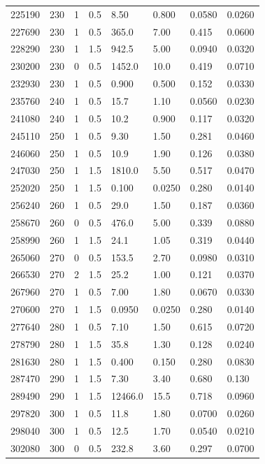 \documentclass[preview]{standalone}
\begin{document}
{{{\begin{tabular}{L{1.2cm}C{1.2cm} C{0.3cm}C{0.5cm} C{1.4cm}C{1.4cm} C{1.4cm}C{1.4cm}}
  225190  &   230  & 1     & 0.5 &  8.50  & 0.800  & 0.0580 &  0.0260   \\ 
  227690  &   230  & 1     & 0.5 &  365.0  & 7.00  & 0.415 &  0.0600   \\ 
  228290  &   230  & 1     & 1.5 &  942.5  & 5.00  & 0.0940 &  0.0320   \\ 
  230200  &   230  & 0     & 0.5 &  1452.0  & 10.0  & 0.419 &  0.0710   \\ 
  232930  &   230  & 1     & 0.5 &  0.900  & 0.500  & 0.152 &  0.0330   \\ 
  235760  &   240  & 1     & 0.5 &  15.7  & 1.10  & 0.0560 &  0.0230   \\ 
  241080  &   240  & 1     & 0.5 &  10.2  & 0.900  & 0.117 &  0.0320   \\ 
  245110  &   250  & 1     & 0.5 &  9.30  & 1.50  & 0.281 &  0.0460   \\ 
  246060  &   250  & 1     & 0.5 &  10.9  & 1.90  & 0.126 &  0.0380   \\ 
  247030  &   250  & 1     & 1.5 &  1810.0  & 5.50  & 0.517 &  0.0470   \\ 
  252020  &   250  & 1     & 1.5 &  0.100  & 0.0250  & 0.280 &  0.0140   \\ 
  256240  &   260  & 1     & 0.5 &  29.0  & 1.50  & 0.187 &  0.0360   \\ 
  258670  &   260  & 0     & 0.5 &  476.0  & 5.00  & 0.339 &  0.0880   \\ 
  258990  &   260  & 1     & 1.5 &  24.1  & 1.05  & 0.319 &  0.0440   \\ 
  265060  &   270  & 0     & 0.5 &  153.5  & 2.70  & 0.0980 &  0.0310   \\ 
  266530  &   270  & 2     & 1.5 &  25.2  & 1.00  & 0.121 &  0.0370   \\ 
  267960  &   270  & 1     & 0.5 &  7.00  & 1.80  & 0.0670 &  0.0330   \\ 
  270600  &   270  & 1     & 1.5 &  0.0950  & 0.0250  & 0.280 &  0.0140   \\ 
  277640  &   280  & 1     & 0.5 &  7.10  & 1.50  & 0.615 &  0.0720   \\ 
  278790  &   280  & 1     & 1.5 &  35.8  & 1.30  & 0.128 &  0.0240   \\ 
  281630  &   280  & 1     & 1.5 &  0.400  & 0.150  & 0.280 &  0.0830   \\ 
  287470  &   290  & 1     & 1.5 &  7.30  & 3.40  & 0.680 &  0.130   \\ 
  289490  &   290  & 1     & 1.5 &  12466.0  & 15.5  & 0.718 &  0.0960   \\ 
  297820  &   300  & 1     & 0.5 &  11.8  & 1.80  & 0.0700 &  0.0260   \\ 
  298040  &   300  & 1     & 0.5 &  12.5  & 1.70  & 0.0540 &  0.0210   \\ 
  302080  &   300  & 0     & 0.5 &  232.8  & 3.60  & 0.297 &  0.0700   \\ 
\hline 
\end{tabular} 

}}}
\end{document}
